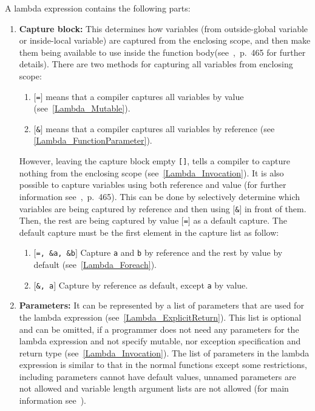 \documentclass[11pt]{report}
\begin{document}
A lambda expression contains the following parts:
\begin{enumerate}
\item \textbf{Capture block:} This determines how variables (from outside-global variable or inside-local variable) are captured from the enclosing scope, and then make them being available to use inside the function body\linebreak (see~\cite{Gregorie:professionalcpp},~p.~465 for further details). There are two methods for capturing all variables from enclosing scope:

      \begin{enumerate}
      \item \texttt{$[$=$]$} means that a compiler captures all variables by value (see~\ref{Lambda_Mutable}).
      \item \texttt{$[$\&$]$} means that a compiler captures all variables by reference (see~     \ref{Lambda_FunctionParameter}).
      \end{enumerate}
      However, leaving the capture block empty \texttt{[]}, tells a compiler to capture nothing from the enclosing scope (see~\ref{Lambda_Invocation}).   
It is also possible to capture variables using both reference and value (for further information see~\cite{Gregorie:professionalcpp},~p.~465). This can be done by selectively determine which variables are being captured by reference and then using \texttt{$[$\&$]$} in front of them. Then, the rest are being captured by value \texttt{$[$=$]$} as a default capture. The default capture must be the first element in the capture list as follow:
      \begin{enumerate}
      \item \texttt{$[$=,~\&a,~\&b$]$} Capture \texttt{a} and \texttt{b} by reference and the rest by value by default (see~\ref{Lambda_Foreach}).
      \item \texttt{$[$\&,~a$]$} Capture by reference as default, except \texttt{a} by value.
      \end{enumerate}
      
      
\item \textbf{Parameters:} It can be represented by a list of parameters that are used for the lambda expression (see~\ref{Lambda_ExplicitReturn}). This list is optional and can be omitted, if a programmer does not need any parameters for the lambda expression and not specify mutable, nor exception specification and return type (see~\ref{Lambda_Invocation}). The list of parameters in the lambda expression is similar to that in the normal functions except some restrictions, including parameters cannot have default values, unnamed parameters are not allowed and variable length argument lists are not allowed (for main information see~\cite{Cppreference:2012:Cpp11}).


\end{enumerate}
\end{document}
